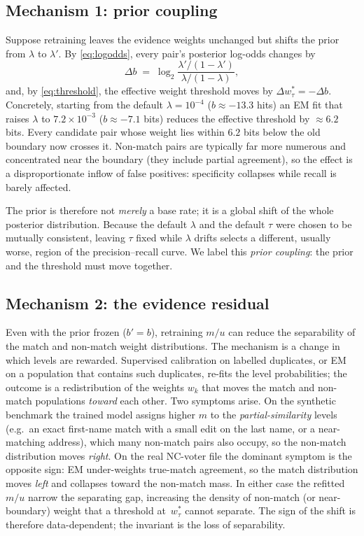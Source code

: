 \documentclass[conference]{IEEEtran}
\begin{document}
\subsection{Mechanism 1: prior coupling}
Suppose retraining leaves the evidence weights unchanged but shifts the prior from
$\lambda$ to $\lambda'$. By \eqref{eq:logodds}, every pair's posterior log-odds changes by
\begin{equation}
\Delta b\;=\;\log_2\frac{\lambda'/(1-\lambda')}{\lambda/(1-\lambda)},
\end{equation}
and, by \eqref{eq:threshold}, the effective weight threshold moves by
$\Delta w_\tau^*=-\Delta b$. Concretely, starting from the default
$\lambda=10^{-4}$ ($b\approx-13.3$ hits) an EM fit that raises $\lambda$ to
$7.2\times10^{-3}$ ($b\approx-7.1$ bits) reduces the effective threshold by
$\approx 6.2$ bits. Every candidate pair whose weight lies within $6.2$ bits below the old
boundary now crosses it. Non-match pairs are typically far more numerous and concentrated
near the boundary (they include partial agreement), so the effect is a disproportionate
inflow of false positives: specificity collapses while recall is barely affected.

The prior is therefore not \emph{merely} a base rate; it is a global shift of the whole
posterior distribution. Because the default $\lambda$ and the default $\tau$ were chosen to
be mutually consistent, leaving $\tau$ fixed while $\lambda$ drifts selects a different,
usually worse, region of the precision--recall curve. We label this \emph{prior coupling}:
the prior and the threshold must move together.

\subsection{Mechanism 2: the evidence residual}
Even with the prior frozen ($b'=b$), retraining $m/u$ can reduce the separability of the
match and non-match weight distributions. The mechanism is a change in which levels are
rewarded. Supervised calibration on labelled duplicates, or EM on a population that contains
such duplicates, re-fits the level probabilities; the outcome is a redistribution of the
weights $w_k$ that moves the match and non-match populations \emph{toward} each other. Two
symptoms arise. On the synthetic benchmark the trained model assigns higher $m$ to the
\emph{partial-similarity} levels (e.g.\ an exact first-name match with a small edit on the
last name, or a near-matching address), which many non-match pairs also occupy, so the
non-match distribution moves \emph{right}. On the real NC-voter file the dominant symptom is
the opposite sign: EM under-weights true-match agreement, so the match distribution moves
\emph{left} and collapses toward the non-match mass. In either case the refitted $m/u$ narrow
the separating gap, increasing the density of non-match (or near-boundary) weight that a
threshold at~$w_\tau^*$ cannot separate. The sign of the shift is therefore data-dependent;
the invariant is the loss of separability.
\end{document}
